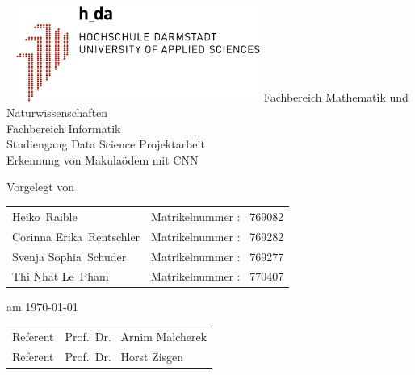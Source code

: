 \documentclass[10pt]{report}
\begin{document}

\begin{titlepage}
\begin{center}\ 
\vfill
\includegraphics[width=0.6\textwidth]{./pic/Logo_h_da}
\vfill
Fachbereich Mathematik und Naturwissenschaften\\
Fachbereich Informatik\\
Studiengang Data Science
\vfill
{\LARGE Projektarbeit} \\[0.5cm]
\vfill
{\Huge Erkennung von Makulaödem mit CNN}
\vfill

Vorgelegt von  

\begin{tabular}{ll}
Heiko\ Raible & Matrikelnummer : \ 769082 \\
Corinna Erika\ Rentschler  & Matrikelnummer : \ 769282 \\
Svenja Sophia\ Schuder & Matrikelnummer : \ 769277 \\
Thi Nhat Le\ Pham  & Matrikelnummer : \ 770407 \\
\end{tabular}

am  \today

\vfill
\begin{tabular}{ll}
Referent     & Prof.\ Dr. \ Arnim Malcherek \\
Referent   & Prof.\ Dr. \ Horst Zisgen
\end{tabular}
\vfill
\end{center}
\end{titlepage}

\begin{abstract} 
Diese einfach gehaltene Vorlage soll eine "'learning by doing"' Einarbeitung ohne allzu langen Vorlauf erm\"oglichen. Es werden beispielhaft typische Elemente einer Abschlussarbeit dargestellt. Ist also ein passendes \LaTeX{} Paket installiert, kann man direkt loslegen und den eigenen Inhalt einf\"ugen.
Die Vorlage ist in erster Linie f\"ur Studierende gedacht, die noch keine Erfahrung mit \LaTeX{} haben und m\"oglichst einfach eine ordentlich gesetzte Abschlussarbeit erstellen wollen. Der Text selbst ist auch das Beispiel f\"ur die typischen Verwendung von \LaTeX{} im Rahmen einer Abschlussarbeit. Es wird versucht, nahe am \LaTeX-Standard zu bleiben und nur wenige tradierte Erweiterungen zu verwenden, z.B. wird auf die COMA-Skript Familie verzichtet.
\end{abstract}
\end{document}
